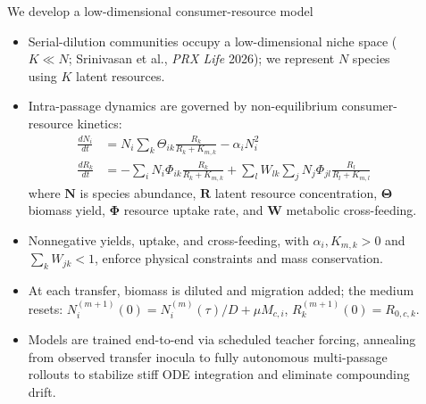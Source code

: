 \documentclass[final]{beamer}
\newlength{\sepwidth}
\newlength{\colwidth}
\newcommand{\separatorcolumn}{\begin{column}{\sepwidth}\end{column}}
\begin{document}
\begin{frame}[t]
\begin{columns}[t]
\begin{column}{\colwidth}
  \begin{block}{We develop a low-dimensional consumer-resource model}
    \begin{itemize}
      \item Serial-dilution communities occupy a low-dimensional niche space ($K \ll N$; Srinivasan et al., \textit{PRX Life} 2026); we represent $N$ species using $K$ latent resources.
      \vspace{10pt}
      \item Intra-passage dynamics are governed by non-equilibrium consumer-resource kinetics:
      \vspace{10pt}
      \begin{align*}
          \frac{dN_i}{dt} &= N_i \sum_k \Theta_{ik} \frac{R_k}{R_k + K_{m,k}} - \alpha_i N_i^2 \\
          \frac{dR_k}{dt} &= - \sum_i N_i \Phi_{ik} \frac{R_k}{R_k + K_{m,k}} + \sum_l W_{lk} \sum_j N_j \Phi_{jl} \frac{R_l}{R_l + K_{m,l}}
      \end{align*}
      \vspace{10pt}
      where $\bm{N}$ is species abundance, $\bm{R}$ latent resource concentration, $\bm{\Theta}$ biomass yield, $\bm{\Phi}$ resource uptake rate, and $\mathbf{W}$ metabolic cross-feeding.
      \vspace{10pt}
      \item Nonnegative yields, uptake, and cross-feeding, with $\alpha_i, K_{m,k}>0$ and $\sum_k W_{jk}<1$, enforce physical constraints and mass conservation.
      \vspace{10pt}
      \item At each transfer, biomass is diluted and migration added; the medium resets: $N_i^{(m+1)}(0)=N_i^{(m)}(\tau)/D+\mu M_{c,i}$, $R_k^{(m+1)}(0)=R_{0,c,k}$.
      \vspace{10pt}
      \item Models are trained end-to-end via scheduled teacher forcing, annealing from observed transfer inocula to fully autonomous multi-passage rollouts to stabilize stiff ODE integration and eliminate compounding drift.
    \end{itemize}
  \end{block}

  \end{column}

\separatorcolumn

\begin{column}{\colwidth}


\end{column}
\end{columns}
\end{frame}
\end{document}
